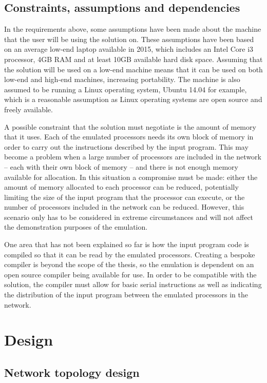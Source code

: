 \documentclass[a4paper, 12pt]{article}
\begin{document}
\subsection{Constraints, assumptions and dependencies}
\label{sec:dependencies}

In the requirements above, some assumptions have been made about the machine that the user will be using the solution on. These assumptions have been based on an average low-end laptop available in 2015, which includes an Intel Core i3 processor, 4GB RAM and at least 10GB available hard disk space. Assuming that the solution will be used on a low-end machine means that it can be used on both low-end and high-end machines, increasing portability. The machine is also assumed to be running a Linux operating system, Ubuntu 14.04 for example, which is a reasonable assumption as Linux operating systems are open source and freely available.

A possible constraint that the solution must negotiate is the amount of memory that it uses. Each of the emulated processors needs its own block of memory in order to carry out the instructions described by the input program. This may become a problem when a large number of processors are included in the network -- each with their own block of memory -- and there is not enough memory available for allocation. In this situation a compromise must be made: either the amount of memory allocated to each processor can be reduced, potentially limiting the size of the input program that the processor can execute, or the number of processors included in the network can be reduced. However, this scenario only has to be considered in extreme circumstances and will not affect the demonstration purposes of the emulation.

One area that has not been explained so far is how the input program code is compiled so that it can be read by the emulated processors. Creating a bespoke compiler is beyond the scope of the thesis, so the emulation is dependent on an open source compiler being available for use. In order to be compatible with the solution, the compiler must allow for basic serial instructions as well as indicating the distribution of the input program between the emulated processors in the network.

\newpage
\section{Design}

\subsection{Network topology design}
\label{sec:network_design}
\end{document}
